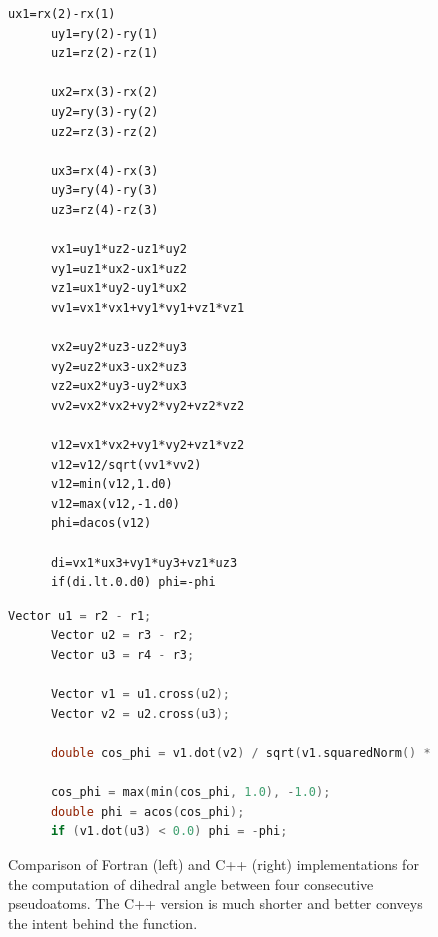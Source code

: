 \begin{figure}[ht]
    \noindent
    \begin{minipage}{.5\textwidth}
      \begin{lstlisting}[language={[77]Fortran}]
      ux1=rx(2)-rx(1)
      uy1=ry(2)-ry(1)
      uz1=rz(2)-rz(1)
    
      ux2=rx(3)-rx(2)
      uy2=ry(3)-ry(2)
      uz2=rz(3)-rz(2)
    
      ux3=rx(4)-rx(3)
      uy3=ry(4)-ry(3)
      uz3=rz(4)-rz(3)
    
      vx1=uy1*uz2-uz1*uy2
      vy1=uz1*ux2-ux1*uz2
      vz1=ux1*uy2-uy1*ux2
      vv1=vx1*vx1+vy1*vy1+vz1*vz1
    
      vx2=uy2*uz3-uz2*uy3
      vy2=uz2*ux3-ux2*uz3
      vz2=ux2*uy3-uy2*ux3
      vv2=vx2*vx2+vy2*vy2+vz2*vz2
    
      v12=vx1*vx2+vy1*vy2+vz1*vz2
      v12=v12/sqrt(vv1*vv2)
      v12=min(v12,1.d0)
      v12=max(v12,-1.d0)
      phi=dacos(v12)
    
      di=vx1*ux3+vy1*uy3+vz1*uz3
      if(di.lt.0.d0) phi=-phi
      \end{lstlisting}
    \end{minipage}%
    \begin{minipage}{.5\textwidth}
      \begin{lstlisting}[language=C++]
      Vector u1 = r2 - r1;
      Vector u2 = r3 - r2;
      Vector u3 = r4 - r3;
      
      Vector v1 = u1.cross(u2);
      Vector v2 = u2.cross(u3);
      
      double cos_phi = v1.dot(v2) / sqrt(v1.squaredNorm() * v2.squaredNorm());
      
      cos_phi = max(min(cos_phi, 1.0), -1.0);
      double phi = acos(cos_phi);
      if (v1.dot(u3) < 0.0) phi = -phi;
      \end{lstlisting}
    \end{minipage}
    \caption{Comparison of Fortran (left) and C++ (right) implementations for the computation of dihedral angle between four consecutive pseudoatoms. The C++ version is much shorter and better conveys the intent behind the function.}
    \label{f:dihedral}
\end{figure}


